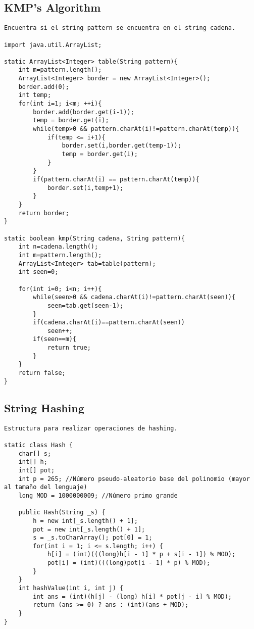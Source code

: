 \documentclass[10pt,letterpaper,twocolumn,twosided]{article}
\begin{document}
\subsection{KMP's Algorithm}
\begin{lstlisting}
Encuentra si el string pattern se encuentra en el string cadena.

import java.util.ArrayList;

static ArrayList<Integer> table(String pattern){
	int m=pattern.length();
	ArrayList<Integer> border = new ArrayList<Integer>();
	border.add(0);
	int temp;
	for(int i=1; i<m; ++i){
		border.add(border.get(i-1));
		temp = border.get(i);
		while(temp>0 && pattern.charAt(i)!=pattern.charAt(temp)){
			if(temp <= i+1){
				border.set(i,border.get(temp-1));
				temp = border.get(i);
			}
		}
		if(pattern.charAt(i) == pattern.charAt(temp)){
			border.set(i,temp+1);
		}
	}
	return border;
}

static boolean kmp(String cadena, String pattern){
	int n=cadena.length();
	int m=pattern.length();
	ArrayList<Integer> tab=table(pattern);
	int seen=0;

	for(int i=0; i<n; i++){
		while(seen>0 && cadena.charAt(i)!=pattern.charAt(seen)){
			seen=tab.get(seen-1);
		}
		if(cadena.charAt(i)==pattern.charAt(seen))
			seen++;
		if(seen==m){
			return true;
		}
	}
	return false;
}
\end{lstlisting}

\subsection{String Hashing}
\begin{lstlisting}
Estructura para realizar operaciones de hashing. 

static class Hash {
	char[] s;
	int[] h;
	int[] pot;
	int p = 265; //Número pseudo-aleatorio base del polinomio (mayor al tamaño del lenguaje)
	long MOD = 1000000009; //Número primo grande
	
	public Hash(String _s) {
		h = new int[_s.length() + 1];
		pot = new int[_s.length() + 1];
		s = _s.toCharArray(); pot[0] = 1;
		for(int i = 1; i <= s.length; i++) {
			h[i] = (int)(((long)h[i - 1] * p + s[i - 1]) % MOD);
			pot[i] = (int)(((long)pot[i - 1] * p) % MOD);
		}
	}
	int hashValue(int i, int j) {
		int ans = (int)(h[j] - (long) h[i] * pot[j - i] % MOD);
		return (ans >= 0) ? ans : (int)(ans + MOD);
	}
}\end{lstlisting}
\end{document}
